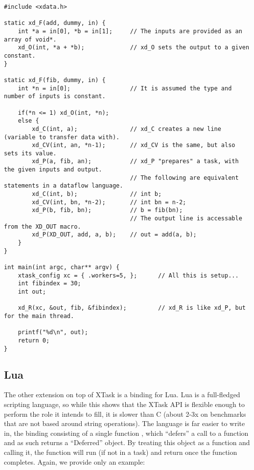 \documentclass{article}
\begin{document}

\begin{verbatim}
#include <xdata.h>

static xd_F(add, dummy, in) {
    int *a = in[0], *b = in[1];     // The inputs are provided as an array of void*.
    xd_O(int, *a + *b);             // xd_O sets the output to a given constant.
}

static xd_F(fib, dummy, in) {
    int *n = in[0];                 // It is assumed the type and number of inputs is constant.

    if(*n <= 1) xd_O(int, *n);
    else {
        xd_C(int, a);               // xd_C creates a new line (variable to transfer data with).
        xd_CV(int, an, *n-1);       // xd_CV is the same, but also sets its value.
        xd_P(a, fib, an);           // xd_P "prepares" a task, with the given inputs and output.
                                    // The following are equivalent statements in a dataflow language.
        xd_C(int, b);               // int b;
        xd_CV(int, bn, *n-2);       // int bn = n-2;
        xd_P(b, fib, bn);           // b = fib(bn);
                                    // The output line is accessable from the XD_OUT macro.
        xd_P(XD_OUT, add, a, b);    // out = add(a, b);
    }
}

int main(int argc, char** argv) {
    xtask_config xc = { .workers=5, };      // All this is setup...
    int fibindex = 30;
    int out;

    xd_R(xc, &out, fib, &fibindex);         // xd_R is like xd_P, but for the main thread.

    printf("%d\n", out);
    return 0;
}
\end{verbatim}

\subsection{Lua}
The other extension on top of XTask is a binding for Lua. Lua is a full-fledged scripting language, so while this shows that the XTask API is flexible enough to perform the role it intends to fill, it is slower than C (about 2-3x on benchmarks that are not based around string operations). The language is far easier to write in, the binding consisting of a single function , which ``defers'' a call to a function and as such returns a ``Deferred'' object. By treating this object as a function and calling it, the function will run (if not in a task) and return once the function completes. Again, we provide only an example:
\end{document}
